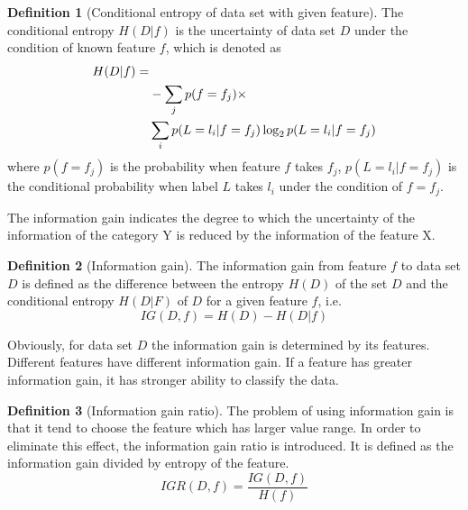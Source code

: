 \documentclass{ieeeaccess}
\theoremstyle{definition}
\newtheorem{defn}{Definition}
\begin{document}
\begin{defn}[Conditional entropy of data set with given feature]
The conditional entropy $H(D|f)$ is the uncertainty of data set $D$ under the condition of known feature $f$, which is denoted as
\begin{align}
     H(D|f)= & \notag \\
    & -\sum_{j} p(f=f_j) \times \notag \\
    & \sum_{i} p(L=l_i|f=f_j) \log_2 p(L=l_i|f=f_j)
\end{align}
where $p(f=f_j)$ is the probability when feature $f$ takes $f_j$, $p(L=l_i | f=f_j)$ is the conditional probability when label $L$ takes $l_i$ under the condition of $f=f_j$.
\end{defn}

The information gain indicates the degree to which the uncertainty of the information of the category Y is reduced by the information of the feature X.

\begin{defn}[Information gain]
    The information gain from feature $f$ to data set $D$ is defined as the difference between the entropy $H(D)$ of the set $D$ and the conditional entropy $H(D|F)$ of $D$ for a given feature $f$, i.e.
\begin{equation}
    IG(D, f) = H(D) - H(D|f)
\end{equation}
\end{defn}

Obviously, for data set $D$ the information gain is determined by its features. Different features have different information gain. If a feature has greater information gain, it has stronger ability to classify the data.

\begin{defn}[Information gain ratio]
The problem of using information gain is that it tend to choose the feature which has larger value range. In order to eliminate this effect, the information gain ratio is introduced. It is defined as the information gain divided by entropy of the feature.
\begin{equation}
    IGR(D, f) = \frac{IG(D, f)}{H(f)}
\end{equation}
\end{defn}
\end{document}
